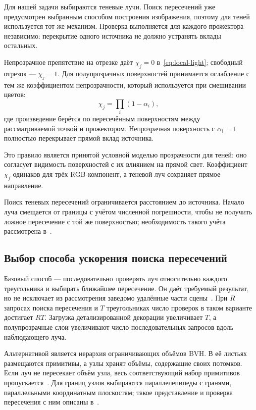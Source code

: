 Для нашей задачи выбираются теневые лучи. Поиск пересечений уже предусмотрен выбранным способом построения изображения, поэтому для теней используется тот же механизм. Проверка выполняется для каждого прожектора независимо: перекрытие одного источника не должно устранять вклады остальных.

Непрозрачное препятствие на отрезке даёт $\chi_j=0$ в~\eqref{eq:local-light}; свободный отрезок --- $\chi_j=1$. Для полупрозрачных поверхностей принимается ослабление с тем же коэффициентом непрозрачности, который используется при смешивании цветов:
\begin{equation}
  \chi_j=\prod_i(1-\alpha_i),
\end{equation}
где произведение берётся по пересечённым поверхностям между рассматриваемой точкой и прожектором. Непрозрачная поверхность с $\alpha_i=1$ полностью перекрывает прямой вклад источника.

Это правило является принятой условной моделью прозрачности для теней: оно согласует видимость поверхностей с их влиянием на прямой свет. Коэффициент $\chi_j$ одинаков для трёх RGB-компонент, а теневой луч сохраняет прямое направление.

Поиск теневых пересечений ограничивается расстоянием до источника. Начало луча смещается от границы с учётом численной погрешности, чтобы не получить ложное пересечение с той же поверхностью; необходимость такого учёта рассмотрена в~\cite[разд.~6.8.6]{pbrt4}.

\subsection{Выбор способа ускорения поиска пересечений}
\label{subsec:acceleration}

Базовый способ --- последовательно проверять луч относительно каждого треугольника и выбирать ближайшее пересечение. Он даёт требуемый результат, но не исключает из рассмотрения заведомо удалённые части сцены~\cite[разд.~1.2.2]{pbrt4}. При $R$ запросах поиска пересечения и $T$ треугольниках число проверок в таком варианте достигает $RT$. Загрузка детализированной декорации увеличивает $T$, а полупрозрачные слои увеличивают число последовательных запросов вдоль наблюдающего луча.

Альтернативой является иерархия ограничивающих объёмов BVH. В её листьях размещаются примитивы, а узлы хранят объёмы, содержащие своих потомков. Если луч не пересекает объём узла, весь соответствующий набор примитивов пропускается~\cite[разд.~7.3]{pbrt4}. Для границ узлов выбираются параллелепипеды с гранями, параллельными координатным плоскостям; такое представление и проверка пересечения с ним описаны в~\cite[разд.~6.1]{pbrt4}.

